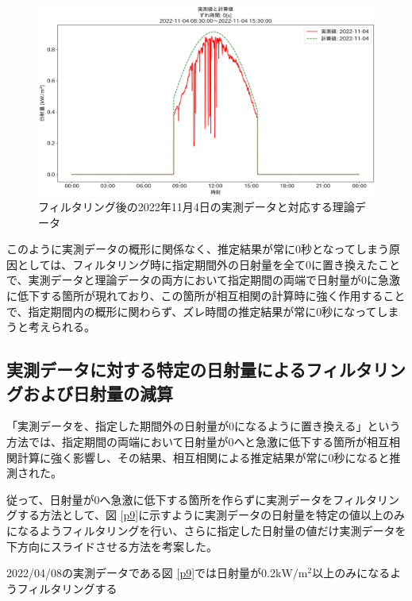 \documentclass[a4j,12pt,]{jarticle}
\begin{document}
\begin{figure}[H]
  \begin{center}
    \includegraphics[width=160mm]{2022-11-04_partial_corr.png}
    \caption{フィルタリング後の2022年11月4日の実測データと対応する理論データ}
    \label{p7}
  \end{center}
\end{figure}

このように実測データの概形に関係なく、推定結果が常に0秒となってしまう原因としては、フィルタリング時に指定期間外の日射量を全て0に置き換えたことで、実測データと理論データの両方において指定期間の両端で日射量が0に急激に低下する箇所が現れており、この箇所が相互相関の計算時に強く作用することで、指定期間内の概形に関わらず、ズレ時間の推定結果が常に0秒になってしまうと考えられる。

\subsection{実測データに対する特定の日射量によるフィルタリングおよび日射量の減算}
「実測データを、指定した期間外の日射量が0になるように置き換える」という方法では、指定期間の両端において日射量が0へと急激に低下する箇所が相互相関計算に強く影響し、その結果、相互相関による推定結果が常に0秒になると推測された。

従って、日射量が0へ急激に低下する箇所を作らずに実測データをフィルタリングする方法として、図 \ref{p9}に示すように実測データの日射量を特定の値以上のみになるようフィルタリングを行い、さらに指定した日射量の値だけ実測データを下方向にスライドさせる方法を考案した。

2022/04/08の実測データである図 \ref{p9}では日射量が0.2$\mathrm{kW}/\mathrm{m}^2$以上のみになるようフィルタリングする
\end{document}
